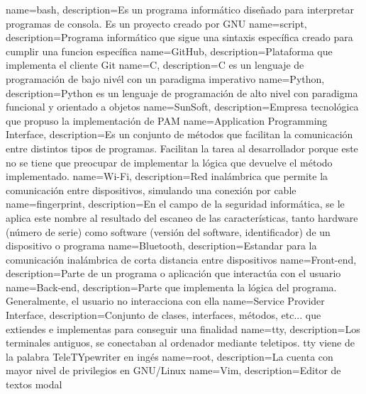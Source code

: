 {
	name=bash,
	description={Es un programa informático diseñado para interpretar programas de consola. Es un proyecto creado por GNU}
}
{
	name=script,
	description={Programa informático que sigue una sintaxis específica creado para cumplir una funcion específica}
}
{
	name=GitHub,
	description={Plataforma que implementa el cliente Git}
}
{
	name=C,
	description={C es un lenguaje de programación de bajo nivél con un paradigma imperativo}
}
{
	name=Python,
	description={Python es un lenguaje de programación de alto nivel con paradigma funcional y orientado a objetos}
}
{
	name=SunSoft,
	description={Empresa tecnológica que propuso la implementación de PAM}
}
{
	name=Application Programming Interface,
	description={Es un conjunto de métodos que facilitan la comunicación entre distintos tipos de programas. Facilitan la tarea al desarrollador porque este no se tiene que preocupar de implementar la lógica que devuelve el método implementado.}
}
{
	name=Wi-Fi,
	description={Red inalámbrica que permite la comunicación entre dispositivos, simulando una conexión por cable}
}
{
	name=fingerprint,
	description={En el campo de la seguridad informática, se le aplica este nombre al resultado del escaneo de las características, tanto hardware (número de serie) como software (versión del software, identificador) de un dispositivo o programa}
}
{
	name=Bluetooth,
	description={Estandar para la comunicación inalámbrica de corta distancia entre dispositivos}
}
{
	name=Front-end,
	description={Parte de un programa o aplicación que interactúa con el usuario}
}
{
	name=Back-end,
	description={Parte que implementa la lógica del programa. Generalmente, el usuario no interacciona con ella}
}
{
	name=Service Provider Interface,
	description={Conjunto de clases, interfaces, métodos, etc... que extiendes e implementas para conseguir una finalidad}
}
{
	name=tty,
	description={Los terminales antiguos, se conectaban al ordenador mediante teletipos. tty viene de la palabra TeleTYpewriter en ingés}
}
{
	name=root,
	description={La cuenta con mayor nivel de privilegios en GNU/Linux}
}
{
	name=Vim,
	description={Editor de textos modal}
}
